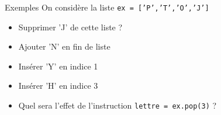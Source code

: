 \documentclass[10pt]{beamer}
\begin{document}
\begin{frame}
	\mframe{\Python}
	\begin{exampleblock}{Exemples}
		On considère la liste {\tt ex = ['P','T','O','J']}
		\begin{itemize}[label=\textbullet]
			\item<4-> Supprimer 'J' de cette liste ?
			\item<5-> Ajouter 'N' en fin de liste
			\item<6-> Insérer 'Y' en indice 1
			\item<7-> Insérer 'H' en indice 3
			\item<8-> Quel sera l'effet de l'instruction {\tt lettre = ex.pop(3)} ?
		\end{itemize}
	\end{exampleblock}
\end{frame}
\end{document}
